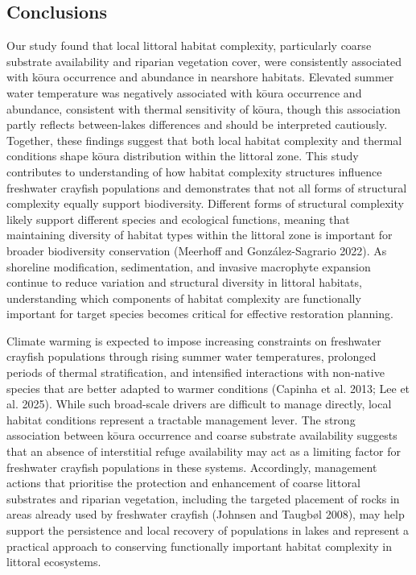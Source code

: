 \documentclass[
  12pt,
  a4paper,
  oneside]{scrbook}
\begin{document}
\subsection{Conclusions}\label{conclusions-1}

Our study found that local littoral habitat complexity, particularly
coarse substrate availability and riparian vegetation cover, were
consistently associated with kōura occurrence and abundance in nearshore
habitats. Elevated summer water temperature was negatively associated
with kōura occurrence and abundance, consistent with thermal sensitivity
of kōura, though this association partly reflects between-lakes
differences and should be interpreted cautiously. Together, these
findings suggest that both local habitat complexity and thermal
conditions shape kōura distribution within the littoral zone. This study
contributes to understanding of how habitat complexity structures
influence freshwater crayfish populations and demonstrates that not all
forms of structural complexity equally support biodiversity. Different
forms of structural complexity likely support different species and
ecological functions, meaning that maintaining diversity of habitat
types within the littoral zone is important for broader biodiversity
conservation (Meerhoff and González-Sagrario 2022). As shoreline
modification, sedimentation, and invasive macrophyte expansion continue
to reduce variation and structural diversity in littoral habitats,
understanding which components of habitat complexity are functionally
important for target species becomes critical for effective restoration
planning.

Climate warming is expected to impose increasing constraints on
freshwater crayfish populations through rising summer water
temperatures, prolonged periods of thermal stratification, and
intensified interactions with non-native species that are better adapted
to warmer conditions (Capinha et al. 2013; Lee et al. 2025). While such
broad-scale drivers are difficult to manage directly, local habitat
conditions represent a tractable management lever. The strong
association between kōura occurrence and coarse substrate availability
suggests that an absence of interstitial refuge availability may act as
a limiting factor for freshwater crayfish populations in these systems.
Accordingly, management actions that prioritise the protection and
enhancement of coarse littoral substrates and riparian vegetation,
including the targeted placement of rocks in areas already used by
freshwater crayfish (Johnsen and Taugbøl 2008), may help support the
persistence and local recovery of populations in lakes and represent a
practical approach to conserving functionally important habitat
complexity in littoral ecosystems.
\end{document}
